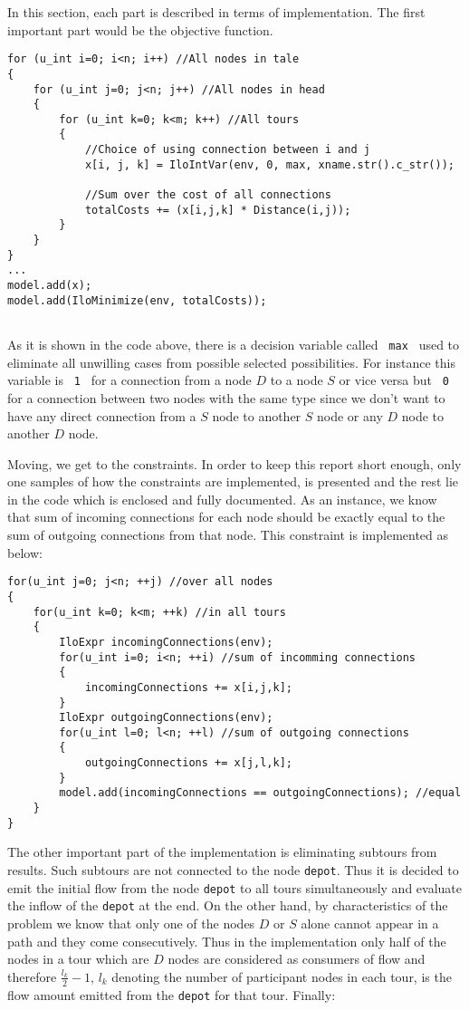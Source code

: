 In this section, each part is described in terms of implementation. The first
important part would be the objective function.

\begin{lstlisting}
for (u_int i=0; i<n; i++) //All nodes in tale
{
    for (u_int j=0; j<n; j++) //All nodes in head
    {
    	for (u_int k=0; k<m; k++) //All tours
        {
            //Choice of using connection between i and j
            x[i, j, k] = IloIntVar(env, 0, max, xname.str().c_str());
            
            //Sum over the cost of all connections
            totalCosts += (x[i,j,k] * Distance(i,j));
        }
    }
}
...
model.add(x);
model.add(IloMinimize(env, totalCosts));
     
\end{lstlisting}

As it is shown in the code above, there is a decision variable called
\texttt{ max } used to eliminate all unwilling cases from possible selected
possibilities. For instance this variable is \texttt{ 1 } for a connection from
a node $D$ to a node $S$ or vice versa but \texttt{ 0 } for a connection between
two nodes with the same type since we don't want to have any direct connection
from a $S$ node to another $S$ node or any $D$ node to another $D$ node.

Moving, we get to the constraints. In order to keep this report short enough,
only one samples of how the constraints are implemented, is presented and the
rest lie in the code which is enclosed and fully documented.
As an instance, we know that sum of incoming connections for each node should
be exactly equal to the sum of outgoing connections from that node. This constraint is implemented as below:

\begin{lstlisting}
for(u_int j=0; j<n; ++j) //over all nodes
{
    for(u_int k=0; k<m; ++k) //in all tours 
    {
        IloExpr incomingConnections(env);
        for(u_int i=0; i<n; ++i) //sum of incomming connections
        {
            incomingConnections += x[i,j,k];
        }
        IloExpr outgoingConnections(env);
        for(u_int l=0; l<n; ++l) //sum of outgoing connections
        {
            outgoingConnections += x[j,l,k];
        }
        model.add(incomingConnections == outgoingConnections); //equal
    }
}
\end{lstlisting}

The other important part of the implementation is eliminating subtours from
results. Such subtours are not connected to the node \texttt{depot}. Thus it is
decided to emit the initial flow from the node \texttt{depot} to all tours
simultaneously and evaluate the inflow of the  \texttt{depot} at the end. On the
other hand, by characteristics of the problem we know that only one of the nodes
$D$ or $S$ alone cannot appear in a path and they come consecutively. Thus in
the implementation only half of the nodes in a tour which are $D$ nodes are
considered as consumers of flow and therefore $\frac{l_k}{2}-1$, $l_k$ denoting
the number of participant nodes in each tour, is the flow amount emitted from
the \texttt{depot} for that tour.
Finally:


